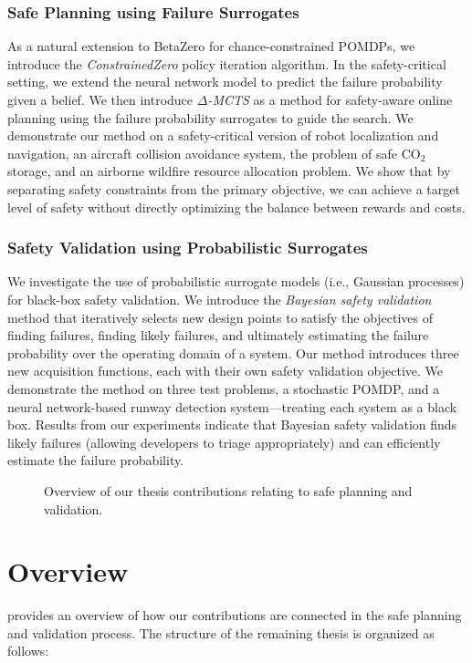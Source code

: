 \subsubsection{Safe Planning using Failure Surrogates}
As a natural extension to BetaZero for chance-constrained POMDPs, we introduce the \textit{ConstrainedZero} policy iteration algorithm.
In the safety-critical setting, we extend the neural network model to predict the failure probability given a belief.
We then introduce \textit{$\Delta$-MCTS} as a method for safety-aware online planning using the failure probability surrogates to guide the search.
We demonstrate our method on a safety-critical version of robot localization and navigation, an aircraft collision avoidance system, the problem of safe CO$_2$ storage, and an airborne wildfire resource allocation problem.
We show that by separating safety constraints from the primary objective, we can achieve a target level of safety without directly optimizing the balance between rewards and costs. 

\subsubsection{Safety Validation using Probabilistic Surrogates}
We investigate the use of probabilistic surrogate models (i.e., Gaussian processes) for black-box safety validation.
We introduce the \textit{Bayesian safety validation} method that iteratively selects new design points to satisfy the objectives of finding failures, finding likely failures, and ultimately estimating the failure probability over the operating domain of a system.
Our method introduces three new acquisition functions, each with their own safety validation objective.
We demonstrate the method on three test problems, a stochastic POMDP, and a neural network-based runway detection system---treating each system as a black box.
Results from our experiments indicate that Bayesian safety validation finds likely failures (allowing developers to triage appropriately) and can efficiently estimate the failure probability.


\begin{figure}[t]
    \centering
    \resizebox{\linewidth}{!}{
        
    }
    \caption{Overview of our thesis contributions relating to safe planning and validation.}
    \label{fig:overview}
\end{figure}


\section{Overview}
 provides an overview of how our contributions are connected in the safe planning and validation process.
The structure of the remaining thesis is organized as follows:

